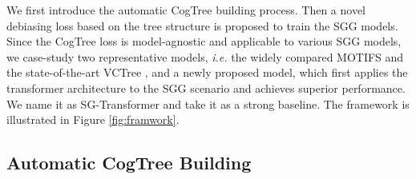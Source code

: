 \documentclass{article}
\begin{document}
We first introduce the automatic CogTree building process. Then a novel debiasing loss based on the tree structure is proposed to train the SGG models. Since the CogTree loss is model-agnostic and applicable to various SGG models, we case-study two representative models, \textit{i.e.} the widely compared MOTIFS \cite{zellers2018neural} and the state-of-the-art VCTree \cite{tang2019learning}, and a newly proposed model, which first applies the transformer \cite{vaswani2017attention} architecture to the SGG scenario and achieves superior performance. We name it as SG-Transformer and take it as a strong baseline.
The framework is illustrated in Figure \ref{fig:framwork}. 


\subsection{Automatic CogTree Building}
\label{ssec: buildTree}
\end{document}
